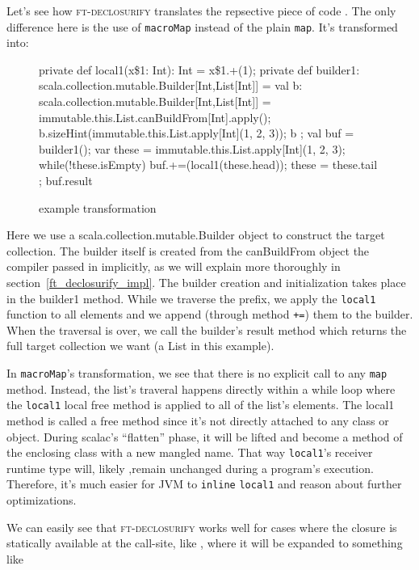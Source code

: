 Let's see how \textsc{ft-declosurify} translates the repsective piece of code
. The only difference here is the use of \texttt{macroMap} instead
of the plain \texttt{map}. It's transformed into:

\begin{figure}
\begin{scalaCode}
{
  private def local1(x\$1: Int): Int = x\$1.+(1);
  private def builder1: scala.collection.mutable.Builder[Int,List[Int]] = {
    val b: scala.collection.mutable.Builder[Int,List[Int]] =
immutable.this.List.canBuildFrom[Int].apply();
    b.sizeHint(immutable.this.List.apply[Int](1, 2, 3));
    b
  };
  val buf = builder1();
  var these = immutable.this.List.apply[Int](1, 2, 3);
  while(!these.isEmpty){
    buf.+=(local1(these.head));
    these = these.tail
  };
  buf.result
}
\end{scalaCode}
\caption[ example transformation]{ example transformation}
\end{figure}

Here we use a scala.collection.mutable.Builder object to construct the target
collection. The builder itself is created from the
canBuildFrom object the compiler passed in implicitly, as we will explain more thoroughly in section~\ref{ft_declosurify_impl}. 
The builder creation and initialization takes place in the
builder1 method. While we traverse the prefix, we apply the \texttt{local1} function to
all elements and we append (through method \texttt{+=}) them to the builder. When the
traversal is over, we call the builder's result method which returns the full
target collection we want (a List in this example).

In \texttt{macroMap}'s transformation, we see that there is no explicit call to any 
\texttt{map} method. Instead, the list's traveral happens directly within a while loop 
where the \texttt{local1} local free method is applied to all of the list's elements. 
The local1 method is called a free method since it's not directly attached to any class or object.
During scalac's ``flatten'' phase, it will be lifted and become a method of
the enclosing class with a new mangled name. That way \texttt{local1}'s receiver runtime type
will, likely ,remain unchanged during a program's execution. Therefore, it's much easier for JVM
to \texttt{inline} \texttt{local1} and reason about further optimizations.

We can easily see that \textsc{ft-declosurify} works well for cases where the closure
is statically available at the call-site, like ,
where it will be expanded to something like

